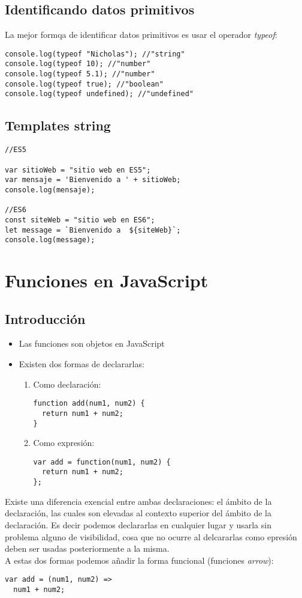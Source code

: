 \documentclass[4paper]{article}
\newcommand{\J}{JavaScript}
\begin{document}
\subsection{Identificando datos primitivos}
La mejor formqa de identificar datos primitivos es usar el operador \emph{typeof}:
\begin{lstlisting}
console.log(typeof "Nicholas"); //"string"
console.log(typeof 10); //"number"
console.log(typeof 5.1); //"number"
console.log(typeof true); //"boolean"
console.log(typeof undefined); //"undefined"
\end{lstlisting}

\subsection{Templates string}
\begin{lstlisting}
//ES5

var sitioWeb = "sitio web en ES5";
var mensaje = 'Bienvenido a ' + sitioWeb;
console.log(mensaje);

//ES6
const siteWeb = "sitio web en ES6";
let message = `Bienvenido a  ${siteWeb}`;
console.log(message);
\end{lstlisting}





\section{Funciones en \J}
\subsection{Introducción}
\begin{itemize}
\item Las funciones son objetos en \J
\item Existen dos formas de declararlas:
\begin{enumerate}
\item Como declaración:
\begin{lstlisting}
function add(num1, num2) {
  return num1 + num2;
}
\end{lstlisting}
\item Como expresión:
\begin{lstlisting}
var add = function(num1, num2) {
  return num1 + num2;
};
\end{lstlisting}
\end{enumerate}
\end{itemize}
Existe una diferencia exencial entre ambas declaraciones: el ámbito de la declaración, las cuales son elevadas al contexto superior del ámbito de la declaración. Es decir podemos declararlas en cualquier lugar y usarla sin problema alguno de visibilidad, cosa que no ocurre al delcararlas como epresión deben ser usadas posteriormente a la misma.\\
A estas dos formas podemos añadir la forma funcional (funciones \emph{arrow}):
\begin{lstlisting}
var add = (num1, num2) =>
  num1 + num2;
\end{lstlisting}
\newpage
\end{document}
